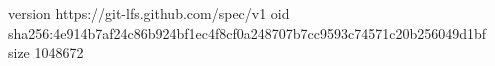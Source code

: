 version https://git-lfs.github.com/spec/v1
oid sha256:4e914b7af24c86b924bf1ec4f8cf0a248707b7cc9593c74571c20b256049d1bf
size 1048672
